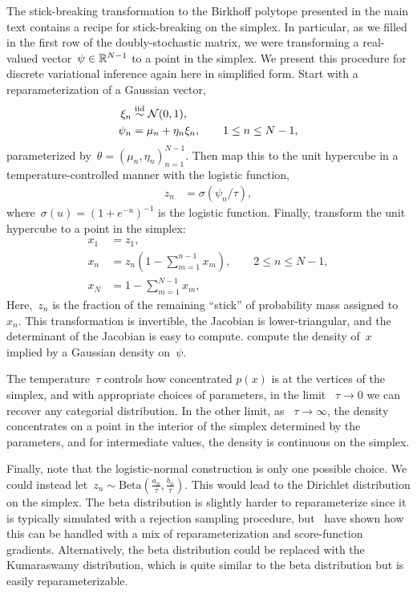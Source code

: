 \documentclass[twoside]{article}
\begin{document}
The stick-breaking transformation to the Birkhoff polytope presented
in the main text contains a recipe for stick-breaking on the simplex.
In particular, as we filled in the first row of the doubly-stochastic
matrix, we were transforming a real-valued vector~$\psi \in \mathbb{R}^{N-1}$
to a point in the simplex.  We present this procedure for
discrete variational inference again here in simplified form.
Start with a reparameterization of a Gaussian vector,
\begin{align*}
  \xi_n &\stackrel{\text{iid}}{\sim} \mathcal{N}(0, 1), \\
  \psi_n & = \mu_n + \eta_n \xi_n, \qquad 1 \leq n \leq N-1,
\end{align*}
parameterized by~${\theta = (\mu_n, \eta_n)_{n=1}^{N-1}}$. 
Then map this to the unit hypercube in a temperature-controlled manner
with the logistic function,
\begin{align*}
  z_n &= \sigma(\psi_n / \tau),
\end{align*}
where~${\sigma(u) = (1+e^{-u})^{-1}}$ is the logistic function.
Finally, transform the unit hypercube to a point in the simplex:
\begin{align*}
  x_1 &= z_1, \\
  x_n &= z_n \left(1- \sum_{m=1}^{n-1} x_m\right), \qquad 2 \leq n \leq N-1,  \\
  x_N &= 1- \sum_{m=1}^{N-1} x_m,
\end{align*}
Here,~$z_n$ is the fraction of the remaining ``stick'' of probability
mass assigned to~$x_n$.  This transformation is invertible, the
Jacobian is lower-triangular, and the determinant of the Jacobian is
easy to compute.  \citet{linderman2015dependent} compute the density
of~$x$ implied by a Gaussian density on~$\psi$.

The temperature~$\tau$ controls how concentrated $p(x)$ is at the
vertices of the simplex, and with appropriate choices of parameters,
in the limit ~$\tau \to 0$ we can recover any categorial
distribution. In the other limit, as ~$\tau \to \infty$, the density
concentrates on a point in the interior of the simplex determined by
the parameters, and for intermediate values, the density is continuous
on the simplex.

Finally, note that the logistic-normal construction is only one
possible choice.  We could instead
let~${z_n \sim \mathrm{Beta}(\tfrac{a_n}{\tau},
  \tfrac{b_n}{\tau})}$. This would lead to the Dirichlet distribution
on the simplex.  The beta distribution is slightly harder to
reparameterize since it is typically simulated with a rejection
sampling procedure, but~\citet{naesseth2017reparameterization} have
shown how this can be handled with a mix of reparameterization and
score-function gradients.  Alternatively, the beta distribution could
be replaced with the Kumaraswamy distribution, which is quite similar
to the beta distribution but is easily reparameterizable.
\end{document}
